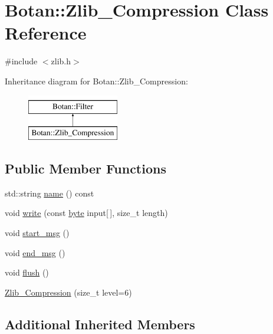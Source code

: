 \hypertarget{classBotan_1_1Zlib__Compression}{\section{Botan\-:\-:Zlib\-\_\-\-Compression Class Reference}
\label{classBotan_1_1Zlib__Compression}
}


{\ttfamily \#include $<$zlib.\-h$>$}

Inheritance diagram for Botan\-:\-:Zlib\-\_\-\-Compression\-:\begin{figure}[H]
\begin{center}
\leavevmode
\includegraphics[height=2.000000cm]{classBotan_1_1Zlib__Compression}
\end{center}
\end{figure}
\subsection*{Public Member Functions}
\begin{DoxyCompactItemize}
\item 
std\-::string \hyperlink{classBotan_1_1Zlib__Compression_a909794df973d63c60f5fff6fa685891f}{name} () const 
\item 
void \hyperlink{classBotan_1_1Zlib__Compression_a32ee52534ab37d954063c09e9f048411}{write} (const \hyperlink{namespaceBotan_a7d793989d801281df48c6b19616b8b84}{byte} input\mbox{[}$\,$\mbox{]}, size\-\_\-t length)
\item 
void \hyperlink{classBotan_1_1Zlib__Compression_a574d43112973868f5013b01d2840a6bc}{start\-\_\-msg} ()
\item 
void \hyperlink{classBotan_1_1Zlib__Compression_a141bf0c77e8dcdd8529a8f72635144a7}{end\-\_\-msg} ()
\item 
void \hyperlink{classBotan_1_1Zlib__Compression_a26dc379608656c7d22b1df9ae78928f0}{flush} ()
\item 
\hyperlink{classBotan_1_1Zlib__Compression_a82d6fa41af6637a5af59e1711c5fb8a7}{Zlib\-\_\-\-Compression} (size\-\_\-t level=6)
\end{DoxyCompactItemize}
\subsection*{Additional Inherited Members}



